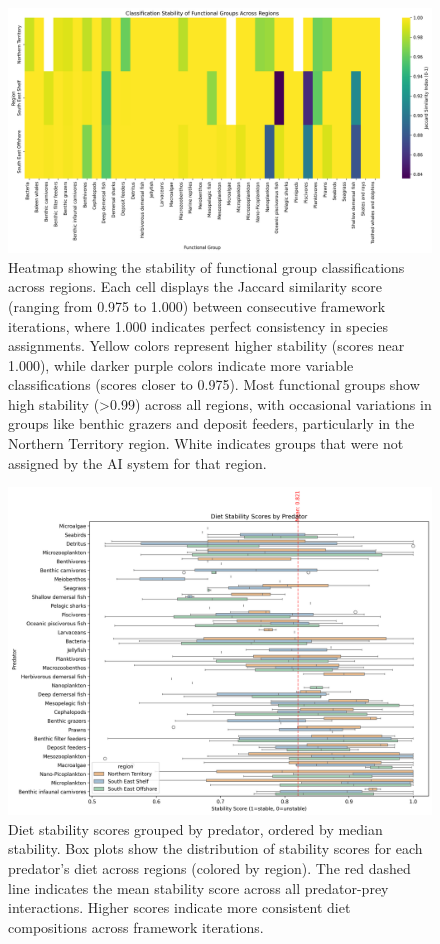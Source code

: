\begin{figure}[htbp]
    \centering
    \includegraphics[width=\textwidth]{figures/group_stability_heatmap.png}
    \caption{Heatmap showing the stability of functional group classifications across regions. Each cell displays the Jaccard similarity score (ranging from 0.975 to 1.000) between consecutive framework iterations, where 1.000 indicates perfect consistency in species assignments. Yellow colors represent higher stability (scores near 1.000), while darker purple colors indicate more variable classifications (scores closer to 0.975). Most functional groups show high stability (>0.99) across all regions, with occasional variations in groups like benthic grazers and deposit feeders, particularly in the Northern Territory region. White indicates groups that were not assigned by the AI system for that region.}
    \label{fig:stability_heatmap_supp}
\end{figure}

\begin{figure}[htbp]
  \centering
  \includegraphics[width=\textwidth]{figures/predator_stability_boxplots.png}
  \caption{Diet stability scores grouped by predator, ordered by median stability. Box plots show the distribution of stability scores for each predator's diet across regions (colored by region). The red dashed line indicates the mean stability score across all predator-prey interactions. Higher scores indicate more consistent diet compositions across framework iterations.}
  \label{fig:predator_stability}
\end{figure}




